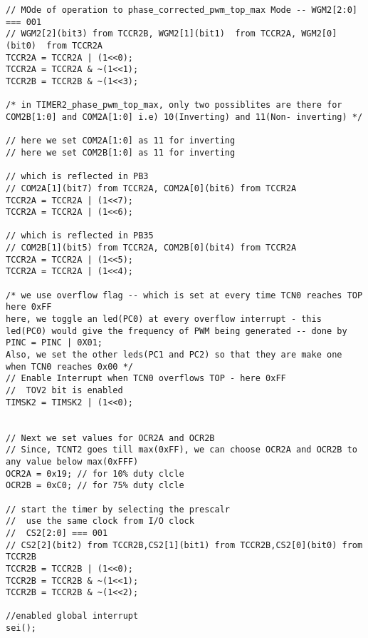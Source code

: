 \begin{verbatim}
// MOde of operation to phase_corrected_pwm_top_max Mode -- WGM2[2:0] === 001
// WGM2[2](bit3) from TCCR2B, WGM2[1](bit1)  from TCCR2A, WGM2[0](bit0)  from TCCR2A
TCCR2A = TCCR2A | (1<<0);
TCCR2A = TCCR2A & ~(1<<1);
TCCR2B = TCCR2B & ~(1<<3);	

/* in TIMER2_phase_pwm_top_max, only two possiblites are there for COM2B[1:0] and COM2A[1:0] i.e) 10(Inverting) and 11(Non- inverting) */

// here we set COM2A[1:0] as 11 for inverting
// here we set COM2B[1:0] as 11 for inverting

// which is reflected in PB3
// COM2A[1](bit7) from TCCR2A, COM2A[0](bit6) from TCCR2A
TCCR2A = TCCR2A | (1<<7);
TCCR2A = TCCR2A | (1<<6);

// which is reflected in PB35
// COM2B[1](bit5) from TCCR2A, COM2B[0](bit4) from TCCR2A
TCCR2A = TCCR2A | (1<<5);
TCCR2A = TCCR2A | (1<<4);

/* we use overflow flag -- which is set at every time TCN0 reaches TOP here 0xFF
here, we toggle an led(PC0) at every overflow interrupt - this led(PC0) would give the frequency of PWM being generated -- done by PINC = PINC | 0X01;
Also, we set the other leds(PC1 and PC2) so that they are make one when TCN0 reaches 0x00 */
// Enable Interrupt when TCN0 overflows TOP - here 0xFF
//  TOV2 bit is enabled
TIMSK2 = TIMSK2 | (1<<0);


// Next we set values for OCR2A and OCR2B
// Since, TCNT2 goes till max(0xFF), we can choose OCR2A and OCR2B to any value below max(0xFFF)
OCR2A = 0x19; // for 10% duty clcle
OCR2B = 0xC0; // for 75% duty clcle

// start the timer by selecting the prescalr
//  use the same clock from I/O clock
//  CS2[2:0] === 001
// CS2[2](bit2) from TCCR2B,CS2[1](bit1) from TCCR2B,CS2[0](bit0) from TCCR2B
TCCR2B = TCCR2B | (1<<0);
TCCR2B = TCCR2B & ~(1<<1);
TCCR2B = TCCR2B & ~(1<<2);

//enabled global interrupt
sei();
\end{verbatim}


